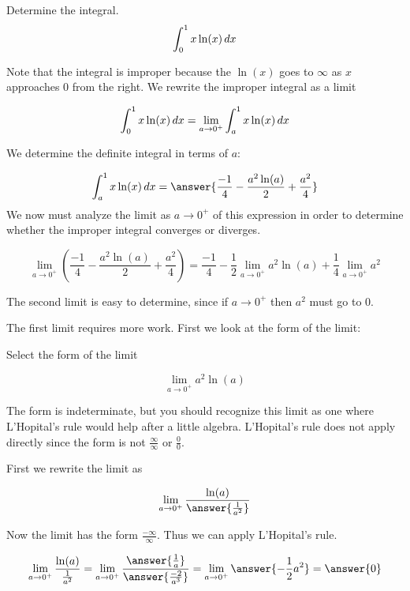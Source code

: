 \documentclass{ximera}
\author{Jason Miller}
\begin{document}
\begin{exercise}
Determine the integral.
\[
\int_0^1 x \ln(x) \mathop{}\!d x 
\]

Note that the integral is improper because the $\ln(x)$ goes to $\infty$ as $x$ approaches $0$ from the right. 
We  rewrite the improper integral as a limit

\[
\int_{0}^{1} x\ln(x) \mathop{}\!d x=\lim_{a \to 0^+} \int_{a}^{1} x\ln(x) \mathop{}\!d x 
\]

We determine the definite integral in terms of $a$:

\[
\int_{a}^{1} x\ln(x) \d x= \answer{\frac{-1}{4} -\frac{a^{2}\ln(a)}{2}+\frac{a^{2}}{4} }
\]
We now must analyze the limit as $a \to 0^+$ of this expression in order to determine whether the improper integral converges or diverges. 

\[
\lim_{a \to 0^+} \left( \frac{-1}{4} -\frac{a^{2}\ln(a)}{2}+\frac{a^{2}}{4} \right) = \frac{-1}{4} -\frac{1}{2}\lim_{a \to 0^+} a^{2} \ln(a) + \frac{1}{4} \lim_{a \to 0^+} a^{2}
\]

The second limit is easy to determine, since if $a \to 0^+$ then $a^2$ must go to $0$. 

The first limit requires more work. First we look at the form of the limit: 

\begin{exercise}
Select the form of the limit 

\[
\lim_{a \to 0^+} a^{2} \ln(a)
\] 

\begin{multipleChoice}
\choice{$0 \cdot \infty$}
\choice[correct]{$0\cdot -\infty$}
\choice{$\infty$}
\end{multipleChoice}

\begin{exercise}

The form is indeterminate, but you should recognize this limit as one where  L'Hopital's rule would help after a little algebra.  L'Hopital's rule does not apply directly since the form is not $\frac{\infty}{\infty}$ or $\frac{0}{0}$. 

First we rewrite the limit as

\[
\lim_{a \to 0^+} \frac{\ln(a)}{\answer{\frac{1}{a^2}}}
\]

\begin{exercise}
Now the limit has the form $\frac{-\infty}{\infty}$. Thus we can apply L'Hopital's rule. 

\[
\lim_{a \to 0^+} \frac{\ln(a)}{\frac{1}{a^2}} =\lim_{a \to 0^+} \frac{\answer{ \frac{1}{a}}}{\answer{\frac{-2}{a^3}}}=
\lim_{a \to 0^+} \answer{ -\frac{1}{2}a^2 }=\answer{0}
\]


\end{exercise}
\end{exercise}
\end{exercise}
\end{exercise}
\end{document}
